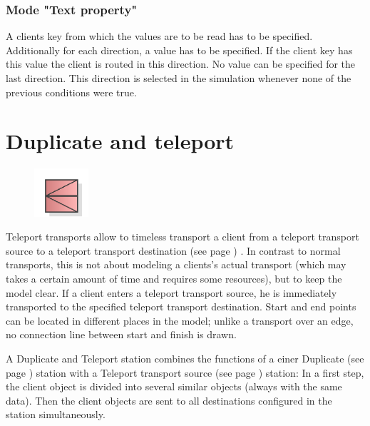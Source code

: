 \subsubsection*{Mode "Text property"}

A clients key from which the values are to be read has to be specified.
Additionally for each direction, a value has to be specified. If the client key has this value the client
is routed in this direction. No value can be specified for the last direction. This direction is selected in the simulation
whenever none of the previous conditions were true.


\section{Duplicate and teleport}
\label{ref:ModelElementTeleportSourceMulti}

\begin{figure}
\vspace{-22pt}
\includegraphics[width=2cm]{imageModelElementTeleportSourceMulti.png}
\vspace{-22pt}
\end{figure}

Teleport transports allow to timeless transport a client from a teleport transport source
to a teleport transport destination (see page \pageref{ref:ModelElementTeleportDestination}) .
In contrast to normal transports, this is not about modeling a clients's actual transport
(which may takes a certain amount of time and requires some resources), but to keep the model clear.
If a client enters a teleport transport source, he is immediately transported to the specified
teleport transport destination. Start and end points can be located in different places in the model;
unlike a transport over an edge, no connection line between start and finish is drawn.

A Duplicate and Teleport station combines the functions of a
einer Duplicate (see page \pageref{ref:ModelElementDuplicate}) station with a
Teleport transport source (see page \pageref{ref:ModelElementTeleportSource}) station:
In a first step, the client object is divided into several similar objects
(always with the same data). Then the client objects are sent to all destinations
configured in the station simultaneously.

